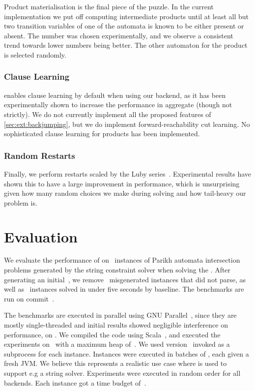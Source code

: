 \documentclass[acmsmall,review,anonymous,screen]{acmart}\settopmatter{printfolios=true,printccs=false,printacmref=true}
\theoremstyle{definition}
\begin{document}
Product materialisation is the final piece of the puzzle. In the current
implementation we put off computing intermediate products until at least all but
two transition variables of one of the automata is known to be either present or
absent. The number was chosen experimentally, and we observe a consistent trend
towards lower numbers being better. The other automaton for the product is
selected randomly.

\subsubsection{Clause Learning}

\Catra{} enables clause learning by default when using our backend, as it has
been experimentally shown to increase the performance in aggregate (though not
strictly). We do not currently implement all the proposed features of
\cref{sec:ext:backjumping}, but we do implement forward-reachability cut
learning. No sophisticated clause learning for products has been implemented.

\subsubsection{Random Restarts}

Finally, we perform restarts scaled by the Luby series~\cite{luby}. Experimental
results have shown this to have a large improvement in performance, which is
unsurprising given how many random choices we make during solving and how
tail-heavy our problem is.

\section{Evaluation}\label{sec:experiments}

We evaluate the performance of \Catra{} on~\NrBenchmarks{} instances of Parikh
automata intersection problems generated by the \Ostrich{} string constraint
solver when solving the . After generating an
initial~\InitialNrBenchmarks{}, we remove~\NrBroken{} misgenerated instances
that did not parse, as well as~\NrTrivial{} instances solved in under five
seconds by baseline. The benchmarks are run on commit~\texttt{\commit}.

The benchmarks are executed in parallel using GNU Parallel~\cite{parallel},
since they are mostly single-threaded and initial results showed negligible
interference on performance, on \BenchmarkRig{}. We compiled the code using
Scala~\ScalaVersion{}, and executed the experiments on~\JvmVersion{} with a
maximum heap of~\MaxHeapSize{}. We used \Nuxmv{} version~\NuxmvVersion{} invoked
as a subprocess for each instance. Instances were executed in batches of
\BatchSize{}, each given a fresh JVM. We believe this represents a realistic use
case where \Calculus{} is used to support e.g a string solver. Experiments were
executed in random order for all backends. Each instance got a time budget
of~\RuntimeTimeout.
\end{document}
